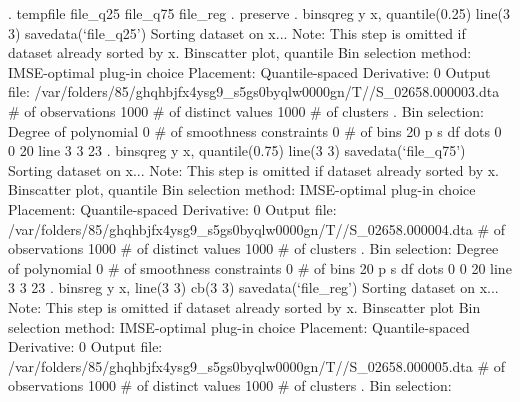 . tempfile file_q25 file_q75 file_reg
{\smallskip}
. preserve
{\smallskip}
. binsqreg y x, quantile(0.25) line(3 3) savedata(`file_q25')
Sorting dataset on x...
Note: This step is omitted if dataset already sorted by x.
{\smallskip}
Binscatter plot, quantile
Bin selection method: IMSE-optimal plug-in choice
Placement: Quantile-spaced
Derivative: 0
Output file: /var/folders/85/ghqhbjfx4ysg9_s5gs0byqlw0000gn/T//S_02658.000003.dta
{\smallskip}
\# of observations             {\VBAR}    1000
\# of distinct values          {\VBAR}    1000
\# of clusters                 {\VBAR}       .
Bin selection:                {\VBAR} 
         Degree of polynomial {\VBAR}       0
  \# of smoothness constraints {\VBAR}       0
                    \# of bins {\VBAR}      20
{\smallskip}
         {\VBAR}      p       s       df
 dots    {\VBAR}      0       0       20
 line    {\VBAR}      3       3       23
{\smallskip}
. binsqreg y x, quantile(0.75) line(3 3) savedata(`file_q75')
Sorting dataset on x...
Note: This step is omitted if dataset already sorted by x.
{\smallskip}
Binscatter plot, quantile
Bin selection method: IMSE-optimal plug-in choice
Placement: Quantile-spaced
Derivative: 0
Output file: /var/folders/85/ghqhbjfx4ysg9_s5gs0byqlw0000gn/T//S_02658.000004.dta
{\smallskip}
\# of observations             {\VBAR}    1000
\# of distinct values          {\VBAR}    1000
\# of clusters                 {\VBAR}       .
Bin selection:                {\VBAR} 
         Degree of polynomial {\VBAR}       0
  \# of smoothness constraints {\VBAR}       0
                    \# of bins {\VBAR}      20
{\smallskip}
         {\VBAR}      p       s       df
 dots    {\VBAR}      0       0       20
 line    {\VBAR}      3       3       23
{\smallskip}
. binsreg y x, line(3 3) cb(3 3) savedata(`file_reg')
Sorting dataset on x...
Note: This step is omitted if dataset already sorted by x.
{\smallskip}
Binscatter plot
Bin selection method: IMSE-optimal plug-in choice
Placement: Quantile-spaced
Derivative: 0
Output file: /var/folders/85/ghqhbjfx4ysg9_s5gs0byqlw0000gn/T//S_02658.000005.dta
{\smallskip}
\# of observations             {\VBAR}    1000
\# of distinct values          {\VBAR}    1000
\# of clusters                 {\VBAR}       .
Bin selection:                {\VBAR} 

